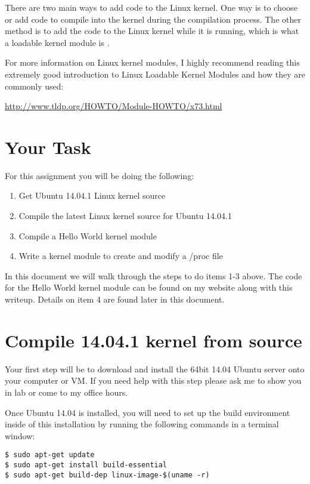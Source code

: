 \documentclass[11pt]{article}
\begin{document}
There are two main ways to add code to the Linux kernel. One way is to choose or add code to compile into the kernel during the compilation process. The other method is to add the code to the Linux kernel while it is running, which is what a loadable kernel module is \cite{tldp}.

For more information on Linux kernel modules, I highly recommend reading this extremely good introduction to Linux Loadable Kernel Modules and how they are commonly used:

{\url{http://www.tldp.org/HOWTO/Module-HOWTO/x73.html}}


\section*{Your Task}

For this assignment you will be doing the following:

\begin{enumerate}
\item{Get Ubuntu 14.04.1 Linux kernel source}
\item{Compile the latest Linux kernel source for Ubuntu 14.04.1}
\item{Compile a Hello World kernel module}
\item{Write a kernel module to create and modify a /proc file}
\end{enumerate}

In this document we will walk through the steps to do items 1-3 above. The code for the Hello World kernel module can be found on my website along with this writeup. Details on item 4 are found later in this document. 



\section*{Compile 14.04.1 kernel from source}
Your first step will be to download and install the 64bit 14.04 Ubuntu server \cite{ubuntuserver} onto your computer or VM. If you need help with this step please ask me to show you in lab or come to my office hours.

Once Ubuntu 14.04 is installed, you will need to set up the build environment inside of this installation by running the following commands in a terminal window:

\begin{verbatim}
$ sudo apt-get update
$ sudo apt-get install build-essential
$ sudo apt-get build-dep linux-image-$(uname -r)
\end{verbatim}
\end{document}
